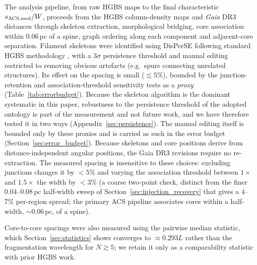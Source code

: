 \documentclass[usenatbib,twoside,twocolumn]{mnras}
\begin{document}
The analysis pipeline, from raw HGBS maps to the final characteristic $s_{\rm ACS,med}/W$, proceeds from the HGBS column-density maps and \textit{Gaia} DR3 distances through skeleton extraction, morphological bridging, core association within $0.06$\,pc of a spine, graph ordering along each component and adjacent-core separation. Filament skeletons were identified using DisPerSE \citep{Sousbie2011} following standard HGBS methodology \citep{Arzoumanian2011}, with a $3\sigma$ persistence threshold and manual editing restricted to removing obvious artefacts (e.g.\ spurs connecting unrelated structures). Its effect on the spacing is small ($\lesssim5\%$), bounded by the junction-retention and association-threshold sensitivity tests as a \emph{proxy} (Table~\ref{tab:errorbudget}). Because the skeleton algorithm is the dominant systematic in this paper, robustness to the persistence threshold of the adopted ontology is part of the measurement and not future work, and we have therefore tested it in two ways (Appendix~\ref{sec:persistence}). The manual editing itself is bounded only by these proxies and is carried as such in the error budget (Section~\ref{sec:error_budget}). Because skeletons and core positions derive from distance-independent angular positions, the Gaia DR3 revisions require no re-extraction. The measured spacing is insensitive to these choices: excluding junctions changes it by $<5\%$ and varying the association threshold between $1\times$ and $1.5\times$ the width by $<3\%$ (a coarse two-point check, distinct from the finer $0.04$--$0.08$\,pc half-width sweep of Section~\ref{sec:injection_recovery} that gives a $4$--$7\%$ per-region spread; the primary ACS pipeline associates cores within a half-width, $\sim0.06$\,pc, of a spine).

Core-to-core spacings were also measured using the pairwise median statistic, which Section~\ref{sec:statistics} shows converges to $\approx0.293L$ rather than the fragmentation wavelength for $N\gtrsim5$; we retain it only as a comparability statistic with prior HGBS work.
\end{document}
